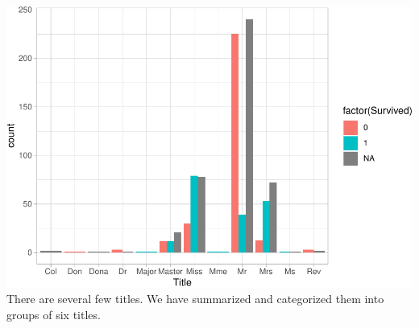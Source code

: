 \documentclass[
]{article}
\begin{document}
\includegraphics{final_pdf_files/figure-latex/unnamed-chunk-25-1.pdf}
There are several few titles. We have summarized and categorized them
into groups of six titles.
\end{document}

